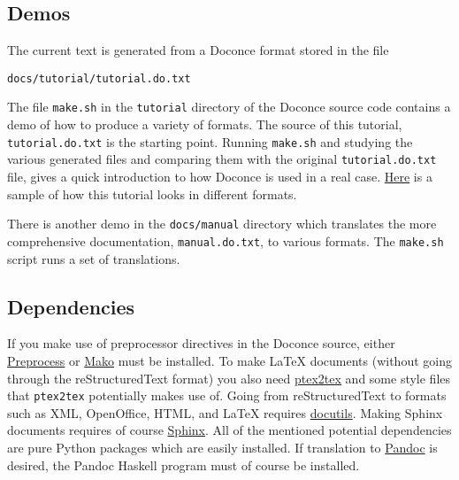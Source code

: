 \documentclass{article}
\begin{document}
\subsection{Demos}

The current text is generated from a Doconce format stored in the file
\begin{Verbatim}[fontsize=\fontsize{9pt}{9pt},tabsize=8,baselinestretch=0.85,
fontfamily=tt,xleftmargin=7mm]
docs/tutorial/tutorial.do.txt
\end{Verbatim}
\noindent
The file {\fontsize{10pt}{10pt}\verb!make.sh!} in the {\fontsize{10pt}{10pt}\verb!tutorial!} directory of the
Doconce source code contains a demo of how to produce a variety of
formats.  The source of this tutorial, {\fontsize{10pt}{10pt}\verb!tutorial.do.txt!} is the
starting point.  Running {\fontsize{10pt}{10pt}\verb!make.sh!} and studying the various generated
files and comparing them with the original {\fontsize{10pt}{10pt}\verb!tutorial.do.txt!} file,
gives a quick introduction to how Doconce is used in a real case.
\href{https://doconce.googlecode.com/hg/doc/demos/tutorial/index.html}{Here}
is a sample of how this tutorial looks in different formats.

There is another demo in the {\fontsize{10pt}{10pt}\verb!docs/manual!} directory which
translates the more comprehensive documentation, {\fontsize{10pt}{10pt}\verb!manual.do.txt!}, to
various formats. The {\fontsize{10pt}{10pt}\verb!make.sh!} script runs a set of translations.

\subsection{Dependencies}

If you make use of preprocessor directives in the Doconce source,
either \href{http://code.google.com/p/preprocess}{Preprocess} or \href{http://www.makotemplates.org}{Mako} must be installed.  To make {\LaTeX}
documents (without going through the reStructuredText format) you also
need \href{http://code.google.com/p/ptex2tex}{ptex2tex} and some style
files that {\fontsize{10pt}{10pt}\verb!ptex2tex!} potentially makes use of.  Going from
reStructuredText to formats such as XML, OpenOffice, HTML, and {\LaTeX}
requires \href{http://docutils.sourceforge.net}{docutils}.  Making Sphinx
documents requires of course \href{http://sphinx.pocoo.org}{Sphinx}.
All of the mentioned potential dependencies are pure Python packages
which are easily installed.
If translation to \href{http://johnmacfarlane.net/pandoc/}{Pandoc} is desired, 
the Pandoc Haskell program must of course be installed.


\printindex
\end{document}
